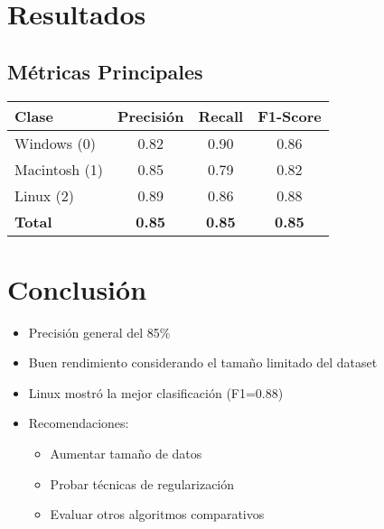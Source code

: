 \documentclass{article}
\begin{document}
\section{Resultados}
\subsection{Métricas Principales}
\begin{center}
\begin{tabular}{|l|c|c|c|}
\hline
\textbf{Clase} & \textbf{Precisión} & \textbf{Recall} & \textbf{F1-Score} \\ \hline
Windows (0) & 0.82 & 0.90 & 0.86 \\ \hline
Macintosh (1) & 0.85 & 0.79 & 0.82 \\ \hline
Linux (2) & 0.89 & 0.86 & 0.88 \\ \hline
\textbf{Total} & \textbf{0.85} & \textbf{0.85} & \textbf{0.85} \\ \hline
\end{tabular}
\end{center}

\section{Conclusión}
\begin{itemize}
    \item Precisión general del 85\%
    \item Buen rendimiento considerando el tamaño limitado del dataset
    \item Linux mostró la mejor clasificación (F1=0.88)
    \item Recomendaciones:
    \begin{itemize}
        \item Aumentar tamaño de datos
        \item Probar técnicas de regularización
        \item Evaluar otros algoritmos comparativos
    \end{itemize}
\end{itemize}
\end{document}

